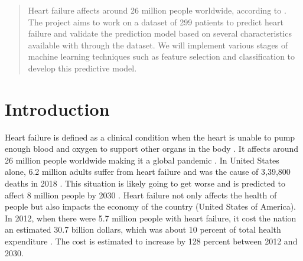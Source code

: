 \documentclass{article}
\begin{document}

\printAffiliationsAndNotice{}

\begin{abstract}

    Heart failure affects around 26 million people worldwide, according to \citet{cdc2021heartfailure}. The project aims to work on a dataset of 299 patients to predict heart failure and validate the prediction model based on several characteristics available with through the dataset. We will implement various stages of machine learning techniques such as feature selection and classification to develop this predictive model.

\end{abstract}


\section{Introduction}

Heart failure is defined as a clinical condition when the heart is unable to pump enough blood and oxygen to support other organs in the body \citep{cdc2021heartfailure}. It affects around 26 million people worldwide making it a global pandemic \citep{savarese2017global}. In United States alone, 6.2 million adults suffer from heart failure and was the cause of 3,39,800 deaths in 2018 \citep{savarese2017global}. This situation is likely going to get worse and is predicted to affect 8 million people by 2030 \citep{lam2011epidemiology}. Heart failure not only affects the health of people but also impacts the economy of the country (United States of America). In 2012, when there were 5.7 million people with heart failure, it cost the nation an estimated 30.7 billion dollars, which was about 10 percent of total health expenditure \citep{cdc2021heartfailure}. The cost is estimated to increase by 128 percent between 2012 and 2030. 
\end{document}
